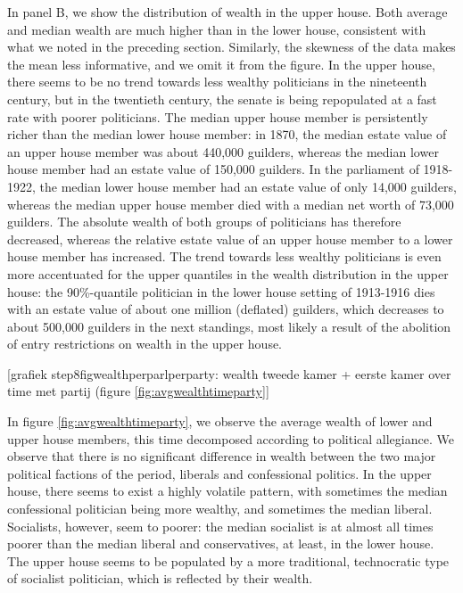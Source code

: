     In panel B, we show the distribution of wealth in the upper house. Both average and median wealth are much higher than in the lower house, consistent with what we noted in the preceding section. Similarly, the skewness of the data makes the mean less informative, and we omit it from the figure. In the upper house, there seems to be no trend towards less wealthy politicians in the nineteenth century, but in the twentieth century, the senate is being repopulated at a fast rate with poorer politicians. The median upper house member is persistently richer than the median lower house member: in 1870, the median estate value of an upper house member was about 440,000 guilders, whereas the median lower house member had an estate value of 150,000 guilders. In the parliament of 1918-1922, the median lower house member had an estate value of only 14,000 guilders, whereas the median upper house member died with a median net worth of 73,000 guilders. The absolute wealth of both groups of politicians has therefore decreased, whereas the relative estate value of an upper house member to a lower house member has increased. The trend towards less wealthy politicians is even more accentuated for the upper quantiles in the wealth distribution in the upper house: the 90\%-quantile politician in the lower house setting of 1913-1916 dies with an estate value of about one million (deflated) guilders, which decreases to about 500,000 guilders in the next standings, most likely a result of the abolition of entry restrictions on wealth in the upper house. 
    
    \begin{center}
        [grafiek step8figwealthperparlperparty: wealth tweede kamer + eerste kamer over time met partij (figure \ref{fig:avgwealthtimeparty}]
    \end{center}
    
    In figure \ref{fig:avgwealthtimeparty}, we observe the average wealth of lower and upper house members, this time decomposed according to political allegiance. We observe that there is no significant difference in wealth between the two major political factions of the period, liberals and confessional politics. In the upper house, there seems to exist a highly volatile pattern, with sometimes the median confessional politician being more wealthy, and sometimes the median liberal. Socialists, however, seem to poorer: the median socialist is at almost all times poorer than the median liberal and conservatives, at least, in the lower house. The upper house seems to be populated by a more traditional, technocratic type of socialist politician, which is reflected by their wealth. 
    
